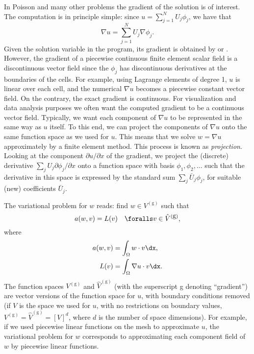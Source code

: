 In Poisson and many other problems the gradient of the solution is of
interest. The computation is in principle simple: since $u = \sum_{j=1}^N
U_j \phi_j$, we have that
\begin{equation}
  \nabla u = \sum_{j=1}^N U_j \nabla \phi_j.
\end{equation}
Given the solution variable  in the program,
its gradient is obtained by  or .
However, the gradient of a piecewise continuous finite
element scalar field is a discontinuous vector field since the $\phi_j$
has discontinuous derivatives at the boundaries of the cells. For example,
using Lagrange elements of degree 1, $u$ is linear over each cell, and
the numerical $\nabla u$ becomes a piecewise constant vector field. On
the contrary, the exact gradient is continuous.  For visualization
and data analysis purposes we often want the computed gradient to be a
continuous vector field. Typically, we want each component of $\nabla
u$ to be represented in the same way as $u$ itself. To this end,
we can project the components of $\nabla u$ onto the same function
space as we used for $u$.  This means that we solve $w = \nabla u$
approximately by a finite element method. This process is known as
\emph{projection}. 
Looking at the component $\partial
u/\partial x$ of the gradient, we project the (discrete) derivative
$\sum_jU_j{\partial \phi_j/\partial x}$ onto a function space
with basis $\phi_1,\phi_2,\ldots$ such that the derivative in
this space is expressed by the standard sum $\sum_j\bar U_j \phi_j$,
for suitable (new) coefficients $\bar U_j$.

The variational problem for $w$ reads: find $w\in V^{(\mbox{g})}$ such that
\begin{equation}
  a(w, v) = L(v)\quad\foralls v\in \hat{V}^{(\mbox{g})},
\end{equation}
where
\begin{align}
  a(w, v) &= \int_\Omega w\cdot v\dx,
\\
  L(v) &= \int_\Omega \nabla u\cdot v\dx.
\end{align}
The function spaces $V^{(\mbox{g})}$ and $\hat{V}^{(\mbox{g})}$ (with
the superscript g denoting ``gradient'') are vector versions of the
function space for $u$, with boundary conditions removed (if $V$ is
the space we used for $u$, with no restrictions on boundary values, $
V^{(\mbox{g})} = \hat{V}^{(\mbox{g})} = [V]^d$, where $d$ is the
number of space dimensions).  For example, if we used piecewise linear
functions on the mesh to approximate $u$, the variational problem for
$w$ corresponds to approximating each component field of $w$ by
piecewise linear functions.

